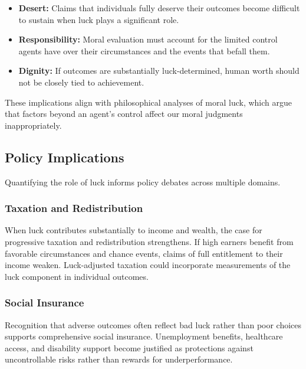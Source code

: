   \begin{itemize}
    \item \textbf{Desert:} Claims that individuals fully deserve their
      outcomes become difficult to sustain when luck plays a significant
      role.

    \item \textbf{Responsibility:} Moral evaluation must account for the
      limited control agents have over their circumstances and the
      events that befall them.

    \item \textbf{Dignity:} If outcomes are substantially luck-determined,
      human worth should not be closely tied to achievement.
  \end{itemize}

  These implications align with philosophical analyses of moral luck,
  which argue that factors beyond an agent's control affect our moral
  judgments inappropriately.

  \subsection{Policy Implications}

  Quantifying the role of luck informs policy debates across multiple domains.

  \subsubsection{Taxation and Redistribution}

  When luck contributes substantially to income and wealth, the case for
  progressive taxation and redistribution strengthens. If high earners
  benefit from favorable circumstances and chance events, claims of full
  entitlement to their income weaken. Luck-adjusted taxation could
  incorporate measurements of the luck component in individual outcomes.

  \subsubsection{Social Insurance}

  Recognition that adverse outcomes often reflect bad luck rather than poor
  choices supports comprehensive social insurance. Unemployment benefits,
  healthcare access, and disability support become justified as
  protections against uncontrollable risks rather than rewards for
  underperformance.

